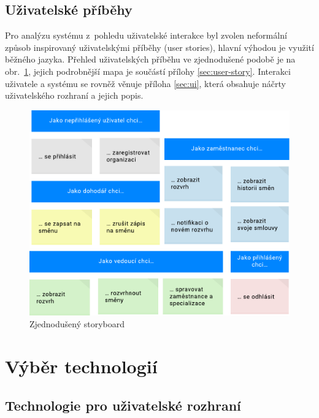 \documentclass[twoside]{ctuthesis}
\begin{document}
\newpage
\section{Uživatelské příběhy}\label{uc-analysis}

Pro analýzu systému z~pohledu uživatelské interakce byl zvolen neformální způsob inspirovaný uživatelskými příběhy (user stories), hlavní výhodou je využití běžného jazyka. Přehled uživatelských příběhu ve zjednodušené podobě je na obr.~\ref{fig:user-stories}, jejich podrobnější mapa je součástí přílohy \ref{sec:user-story}. Interakci uživatele a systému se rovněž věnuje příloha \ref{sec:ui}, která obsahuje náčrty uživatelského rozhraní a jejich popis.

\begin{figure}[h!]
	\includegraphics[scale=0.7]{user-stories.pdf}
	\caption{Zjednodušený storyboard}
	\label{fig:user-stories}
\end{figure}

\newpage

\chapter{Výběr technologií}

\section{Technologie pro uživatelské rozhraní}
\end{document}
